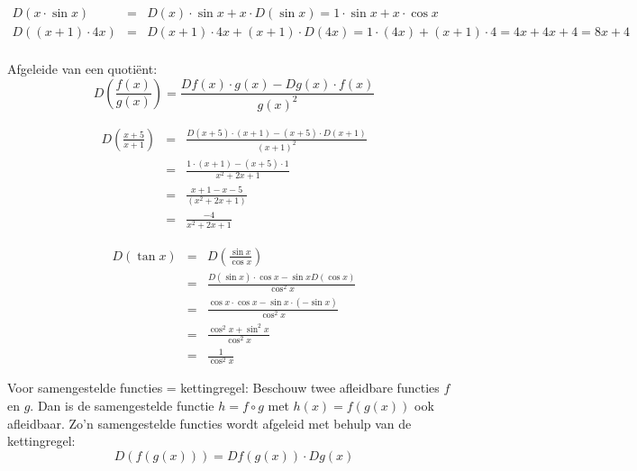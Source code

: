\begin{voorbeeld}
\begin{eqnarray*}
	D(x \cdot  \sin x)&=& D(x)\cdot \sin x + x \cdot D(\sin x) = 1 \cdot \sin x + x \cdot \cos x\\
	D((x+1)\cdot 4x)&=&D(x+1)\cdot 4x+(x+1)\cdot D(4x)=1 \cdot (4x)+(x+1)\cdot 4 = 4x+4x+4=8x+4\\
\end{eqnarray*}
\end{voorbeeld}

\begin{ftrekenregel}
	Afgeleide van een quoti\"ent: 
	\begin{equation*}
	D(\frac{f(x)}{g(x)}) = \frac{Df(x) \cdot g(x) - Dg(x) \cdot f(x)}{g(x)^2}
	\end{equation*}
\end{ftrekenregel}

\begin{voorbeeld}
\begin{eqnarray*}
D(\frac{x+5}{x+1}) &=& \frac{D(x+5)\cdot (x+1)-(x+5)\cdot D(x+1)}{(x+1)^2} \\
&=& \frac{1 \cdot (x+1)-(x+5)\cdot 1}{x^2+2x+1} \\
&=& \frac{x+1-x-5}{(x^2+2x+1)}\\
&=& \frac{-4}{x^2+2x+1}
\end{eqnarray*}
\end{voorbeeld}

\begin{voorbeeld}
	\begin{eqnarray*}
		D(\tan x) &=& D(\frac{\sin x}{\cos x}) \\
		&=& \frac{D(\sin x) \cdot \cos x-\sin x D(\cos x)}{\cos ^2 x} \\
		&=& \frac{\cos x \cdot \cos x-\sin x \cdot (- \sin x)}{\cos ^2 x}\\
		&=& \frac{\cos^2 x + \sin^2 x}{\cos ^2 x} \\
		&=& \frac{1}{\cos ^2 x}
	\end{eqnarray*}
\end{voorbeeld}

\begin{ftrekenregel}
	Voor samengestelde functies = kettingregel:
	Beschouw twee afleidbare functies $f$ en $g$. Dan is de samengestelde functie $h=f \circ g$ met $h(x)=f(g(x))$ ook afleidbaar.
	Zo'n samengestelde functies wordt afgeleid met behulp van de kettingregel:
	\begin{equation*}
	D(f(g(x))) = Df(g(x)) \cdot Dg(x)
	\end{equation*}
\end{ftrekenregel}

